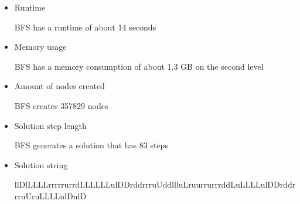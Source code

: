 \documentclass[../../main.tex]{subfiles}
\begin{document}
\begin{itemize}

	\item Runtime 		
 		
 	BFS has a runtime of about 14 seconds
 		
	\item Memory usage
		
	BFS has a memory consumption of about 1.3 GB on the second level
	
	\item Amount of nodes created
	
	BFS creates 357829 nodes
	
	\item Solution step length
	
	BFS generates a solution that has 83 steps
	
	\item Solution string
	
	llDlLLLLrrrrrurrdLLLLLLulDDrddrrruUddllluLruurrurrrddLuLLLLulDDrddrrruUruLLLLulDulD
		
 \end{itemize}
\end{document}

